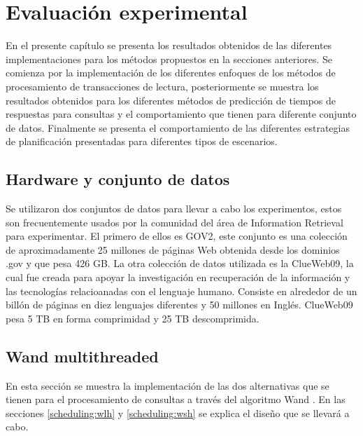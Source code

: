 \chapter{Evaluación experimental}
\label{cap:evaluacionexperimental}

En el presente capítulo se presenta los resultados obtenidos de las diferentes implementaciones para los métodos propuestos en la secciones anteriores. Se comienza por la implementación de los diferentes enfoques de los métodos de procesamiento de transacciones de lectura, posteriormente se muestra los resultados obtenidos para los diferentes métodos de predicción de tiempos de respuestas para consultas y el comportamiento que tienen para diferente conjunto de datos. Finalmente se presenta el comportamiento de las diferentes estrategias de planificación presentadas para diferentes tipos de escenarios.


\section{Hardware y conjunto de datos}
\label{evaluacionexperimental:hardwareydatos}

Se utilizaron dos conjuntos de datos para llevar a cabo los experimentos, estos son frecuentemente usados por la comunidad del área de Information Retrieval para experimentar. El primero de ellos es GOV2, este conjunto es una colección de aproximadamente 25 millones de páginas Web obtenida desde los dominios .gov y que pesa 426 GB. La otra colección de datos utilizada es la ClueWeb09, la cual fue creada para apoyar la investigación en recuperación de la información y las tecnologías relacioanadas con el lenguaje humano. Consiste en alrededor de un billón de páginas en diez lenguajes diferentes y 50 millones en Inglés. ClueWeb09 pesa 5 TB en forma comprimidad y 25 TB descomprimida. 




\section{Wand multithreaded}
\label{evaluacionexperimental:wm}
En esta sección se muestra la implementación de las dos alternativas que se tienen para el procesamiento de consultas a través del algoritmo Wand \citep{Broder:2003}. En las secciones \ref{scheduling:wlh} y \ref{scheduling:wsh} se explica el diseño que se llevará a cabo. 

